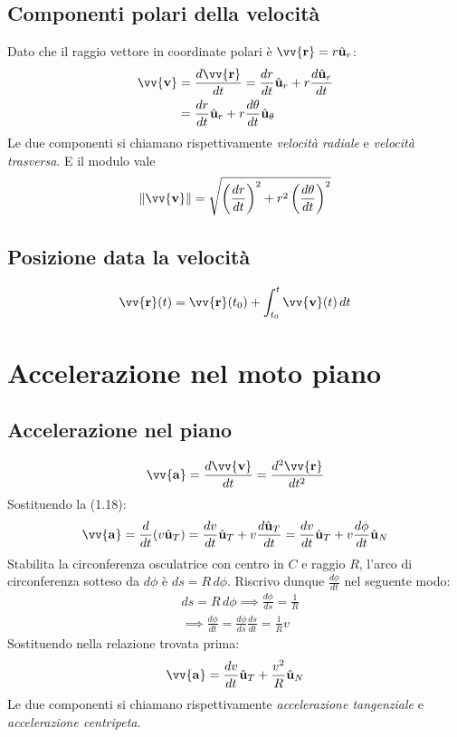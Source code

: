 \documentclass{report}
\newcommand{\versore}[1]{\hat{\mathbf{u}}_{#1}}
\newcommand{\uT}{\versore{T}}
\newcommand{\uN}{\versore{N}}
\newcommand{\ur}{\versore{r}}
\newcommand{\uth}{\versore{\theta}}
\newcommand{\vett}[1]{\vv{\boldsymbol{\mathbf{#1}}}}
\begin{document}
\subsection{Componenti polari della velocità}
Dato che il raggio vettore in coordinate polari è \(\vett{r} = r\ur\):
\begin{align}
    \vett{v} & = \frac{d\vett{r}}{dt} = \frac{dr}{dt}\ur + r\frac{d\ur}{dt} \nonumber \\
    & = \frac{dr}{dt}\ur + r\frac{d\theta}{dt}\uth 
\end{align}
Le due componenti si chiamano rispettivamente \emph{velocità radiale} e \emph{velocità trasversa}.
E il modulo vale
\begin{equation*}
    \norm{\vett{v}} = \sqrt{\left(\frac{dr}{dt}\right)^2 + r^2\left(\frac{d\theta}{dt}\right)^2}
\end{equation*}

\subsection{Posizione data la velocità}
\begin{equation}
    \vett{r}(t) = \vett{r}(t_0) + \int_{t_0}^{t} \vett{v}(t)\,dt 
\end{equation}

\section{Accelerazione nel moto piano}
\subsection{Accelerazione nel piano}
\begin{equation}
    \vett{a} = \frac{d\vett{v}}{dt} = \frac{d^2\vett{r}}{dt^2}
\end{equation}
Sostituendo la (1.18):
\begin{equation*}
    \vett{a} = \frac{d}{dt}(v\uT) = \frac{dv}{dt}\uT + v\frac{d\uT}{dt}
    = \frac{dv}{dt}\uT + v\frac{d\phi}{dt}\uN
\end{equation*}
Stabilita la circonferenza osculatrice con centro in \(C\) e raggio \(R\), 
l'arco di circonferenza sotteso da \(d\phi\) è \(ds = R\,d\phi\). Riscrivo 
dunque \(\frac{d\phi}{dt}\) nel seguente modo:
\begin{align*}
    & ds = R\,d\phi \implies \frac{d\phi}{ds} = \frac{1}{R} \\
    & \implies \frac{d\phi}{dt} = \frac{d\phi}{ds}\frac{ds}{dt} = \frac{1}{R}v
\end{align*}
Sostituendo nella relazione trovata prima:
\begin{equation}
    \vett{a} = \frac{dv}{dt}\uT + \frac{v^2}{R}\uN
\end{equation}
Le due componenti si chiamano rispettivamente \emph{accelerazione tangenziale} e \emph{accelerazione centripeta}.
\end{document}
